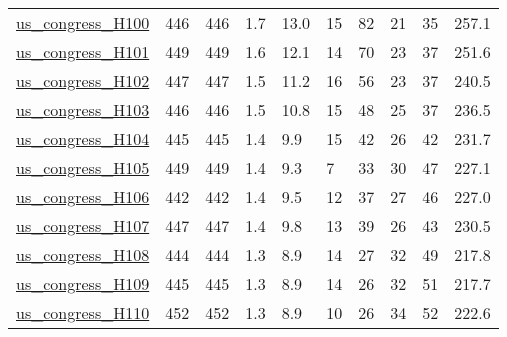 \begin{longtable}{llllllllll}
 \href{https://doi.org/10.6084/m9.figshare.8096429}{us\_congress\_H100}                                                       & 446        & 446   & 1.7    & 13.0   & 15    & 82     & 21     & 35     & 257.1   \\
 \href{https://doi.org/10.6084/m9.figshare.8096429}{us\_congress\_H101}                                                       & 449        & 449   & 1.6    & 12.1   & 14    & 70     & 23     & 37     & 251.6   \\
 \href{https://doi.org/10.6084/m9.figshare.8096429}{us\_congress\_H102}                                                       & 447        & 447   & 1.5    & 11.2   & 16    & 56     & 23     & 37     & 240.5   \\
 \href{https://doi.org/10.6084/m9.figshare.8096429}{us\_congress\_H103}                                                       & 446        & 446   & 1.5    & 10.8   & 15    & 48     & 25     & 37     & 236.5   \\
 \href{https://doi.org/10.6084/m9.figshare.8096429}{us\_congress\_H104}                                                       & 445        & 445   & 1.4    & 9.9    & 15    & 42     & 26     & 42     & 231.7   \\
 \href{https://doi.org/10.6084/m9.figshare.8096429}{us\_congress\_H105}                                                       & 449        & 449   & 1.4    & 9.3    & 7     & 33     & 30     & 47     & 227.1   \\
 \href{https://doi.org/10.6084/m9.figshare.8096429}{us\_congress\_H106}                                                       & 442        & 442   & 1.4    & 9.5    & 12    & 37     & 27     & 46     & 227.0   \\
 \href{https://doi.org/10.6084/m9.figshare.8096429}{us\_congress\_H107}                                                       & 447        & 447   & 1.4    & 9.8    & 13    & 39     & 26     & 43     & 230.5   \\
 \href{https://doi.org/10.6084/m9.figshare.8096429}{us\_congress\_H108}                                                       & 444        & 444   & 1.3    & 8.9    & 14    & 27     & 32     & 49     & 217.8   \\
 \href{https://doi.org/10.6084/m9.figshare.8096429}{us\_congress\_H109}                                                       & 445        & 445   & 1.3    & 8.9    & 14    & 26     & 32     & 51     & 217.7   \\
 \href{https://doi.org/10.6084/m9.figshare.8096429}{us\_congress\_H110}                                                       & 452        & 452   & 1.3    & 8.9    & 10    & 26     & 34     & 52     & 222.6   \\

\end{longtable}
